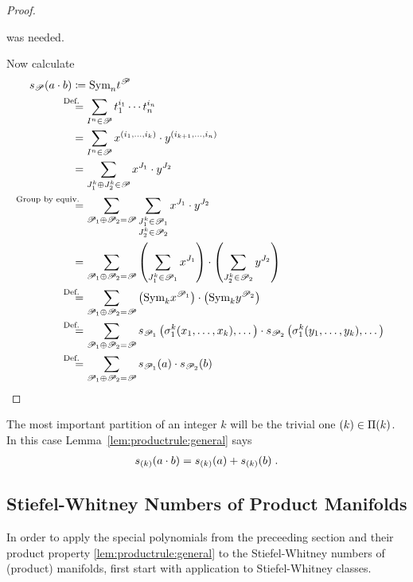 \begin{Lem}
\begin{proof}
\begin{itemize}
      was needed.
    \end{itemize}
    Now calculate
    \begin{align*}
      \s{\Part}(a\cdot b)
      &\coloneqq
        \symm{n} t^{\Part}
      \\ &\equalsby{Def.}
           \sum_{I^n\in\Part}
           t_1^{i_1}\dotsm t_n^{i_n}
      \\ &=
           \sum_{I^n\in\Part}
           x^{(i_1,\dotsc,i_k)}\cdot y^{(i_{k+1},\dotsc,i_n)}
      \\ &=
           \sum_{J_1^k\concat J_2^k\in\Part}
           x^{J_1} \cdot y^{J_2}
      \\ &\equalsby{Group by equiv.}
           \sum_{\Part_1\concat \Part_2=\Part}
           \sum_{\substack{J_1^k\in\Part_1\\ J_2^k\in\Part_2}}
      x^{J_1} \cdot y^{J_2}
      \\ &=
           \sum_{\Part_1\concat \Part_2=\Part}
           \left(\sum_{J_1^k\in\Part_1} x^{J_1}\right)
           \cdot
           \left(\sum_{J_2^k\in\Part_2} y^{J_2}\right)
      \\ &\equalsby{Def.}
           \sum_{\Part_1\concat \Part_2=\Part}
           \left(\symm{k} x^{\Part_1}\right)
           \cdot
           \left(\symm{k} y^{\Part_2}\right)
      \\ &\equalsby{Def.}
           \sum_{\Part_1\concat \Part_2=\Part}
           \s{\Part_1}\left( \el 1 k(x_1,\dotsc,x_k),\dotsc \right)
           \cdot
           \s{\Part_2}\left( \el 1 k(y_1,\dotsc,y_k),\dotsc \right)
      \\ &\equalsby{Def.}
           \sum_{\Part_1\concat \Part_2=\Part}
           \s{\Part_1}(a) \cdot \s{\Part_2}(b)
           \qedhere
    \end{align*}
  \end{proof}
\end{Lem}

\begin{Ex}
  The most important partition of an integer $k$ will be the trivial
  one $(k)\in\Pi({k})$. In this case
  Lemma~\autoref{lem:productrule:general} says
  \begin{gather*}
    s_{(k)}(a\cdot b) = s_{(k)}(a) + s_{(k)}(b)
    \;.
  \end{gather*}
\end{Ex}


\subsection{Stiefel-Whitney Numbers of Product Manifolds}
In order to apply the special polynomials from the preceeding section
and their product property \autoref{lem:productrule:general} to
the Stiefel-Whitney numbers of (product) manifolds, first start with application
to Stiefel-Whitney classes.

